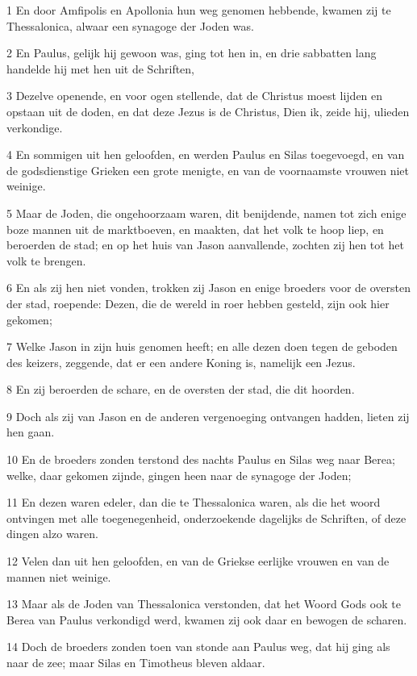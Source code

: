 \par 1 En door Amfipolis en Apollonia hun weg genomen hebbende, kwamen zij te Thessalonica, alwaar een synagoge der Joden was.
\par 2 En Paulus, gelijk hij gewoon was, ging tot hen in, en drie sabbatten lang handelde hij met hen uit de Schriften,
\par 3 Dezelve openende, en voor ogen stellende, dat de Christus moest lijden en opstaan uit de doden, en dat deze Jezus is de Christus, Dien ik, zeide hij, ulieden verkondige.
\par 4 En sommigen uit hen geloofden, en werden Paulus en Silas toegevoegd, en van de godsdienstige Grieken een grote menigte, en van de voornaamste vrouwen niet weinige.
\par 5 Maar de Joden, die ongehoorzaam waren, dit benijdende, namen tot zich enige boze mannen uit de marktboeven, en maakten, dat het volk te hoop liep, en beroerden de stad; en op het huis van Jason aanvallende, zochten zij hen tot het volk te brengen.
\par 6 En als zij hen niet vonden, trokken zij Jason en enige broeders voor de oversten der stad, roepende: Dezen, die de wereld in roer hebben gesteld, zijn ook hier gekomen;
\par 7 Welke Jason in zijn huis genomen heeft; en alle dezen doen tegen de geboden des keizers, zeggende, dat er een andere Koning is, namelijk een Jezus.
\par 8 En zij beroerden de schare, en de oversten der stad, die dit hoorden.
\par 9 Doch als zij van Jason en de anderen vergenoeging ontvangen hadden, lieten zij hen gaan.
\par 10 En de broeders zonden terstond des nachts Paulus en Silas weg naar Berea; welke, daar gekomen zijnde, gingen heen naar de synagoge der Joden;
\par 11 En dezen waren edeler, dan die te Thessalonica waren, als die het woord ontvingen met alle toegenegenheid, onderzoekende dagelijks de Schriften, of deze dingen alzo waren.
\par 12 Velen dan uit hen geloofden, en van de Griekse eerlijke vrouwen en van de mannen niet weinige.
\par 13 Maar als de Joden van Thessalonica verstonden, dat het Woord Gods ook te Berea van Paulus verkondigd werd, kwamen zij ook daar en bewogen de scharen.
\par 14 Doch de broeders zonden toen van stonde aan Paulus weg, dat hij ging als naar de zee; maar Silas en Timotheus bleven aldaar.
